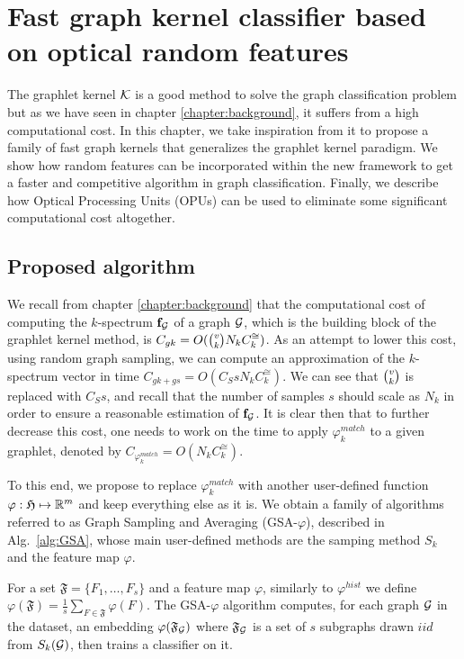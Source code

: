 \chapter{Fast graph kernel classifier based on optical random features }
\label{chapter:fast_algorithm}
\newtheorem{lemma}{Lemma} 
The graphlet kernel $\mathcal{K}$ is a good method to solve the graph classification problem but as we have seen in chapter \ref{chapter:background}, it suffers from a high computational cost. In this chapter, we take inspiration from it to propose a family of fast graph kernels that generalizes the graphlet kernel paradigm. We show how random features can be incorporated within the new framework to get a faster and competitive algorithm in graph classification. Finally, we describe how Optical Processing Units (OPUs) can be used to eliminate some significant computational cost altogether.

\section{Proposed algorithm}
We recall from chapter \ref{chapter:background} that the computational cost of computing the $k$-spectrum $\mathbf{f}_{\mathcal{G}}$ of a graph $\mathcal{G}$, which is the building block of the graphlet kernel method, is $C_{gk}= O(\tbinom{v}{k} N_k C_k^{\cong})$. As an attempt to lower this cost, using random graph sampling, we can compute an approximation of the $k$-spectrum vector in time $C_{gk + gs}= O(C_S s N_k C_k^{\cong})$. We can see that $\tbinom{v}{k}$ is replaced with $C_S s$, and recall that the number of samples $s$  should scale as $N_k$ in order to ensure a reasonable estimation of $\mathbf{f}_{\mathcal{G}}$. It is clear then that to further decrease this cost, one needs to work on the time to apply $\varphi_k^{match}$ to a given graphlet, denoted by $C_{\varphi_k^{match}}=O(N_k C_k^{\cong})$.

To this end, we propose to replace $\varphi^{match}_k$ with another user-defined function $\varphi:\mathfrak{H} \mapsto\mathbb{R}^m$ and keep everything else as it is. We obtain a family of algorithms referred to as Graph Sampling and Averaging (GSA-$\varphi$), described in Alg.~\ref{alg:GSA}, whose main user-defined methods are the samping method $S_k$ and the feature map $\varphi$.

For a set $\mathfrak{F} = \{F_1,\ldots, F_s\}$ and a feature map $\varphi$, similarly to ${\varphi}^{hist}$ we define ${\varphi}(\mathfrak{F}) = \frac{1}{s} \sum_{F\in\mathfrak{F}} \varphi(F)$. The GSA-$\varphi$ algorithm computes, for each graph $\mathcal{G}$ in the dataset, an embedding ${\varphi}(\mathfrak{F}_{\mathcal{G}})$ where $\mathfrak{F}_{\mathcal{G}}$ is a set of $s$ subgraphs drawn $iid$ from $S_k(\mathcal{G})$, then trains a classifier on it.

